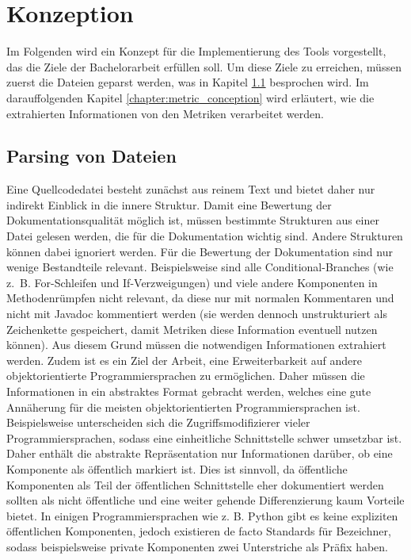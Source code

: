 \begingroup
\renewcommand{\cleardoublepage}{} %
\renewcommand{\clearpage}{}
\chapter{Konzeption}\label{chapter_conception}
\endgroup
Im Folgenden wird ein Konzept für die Implementierung des Tools vorgestellt, das die Ziele der Bachelorarbeit erfüllen soll. Um diese Ziele zu erreichen, müssen zuerst die Dateien geparst werden, was in Kapitel \ref{chapter:parsing} besprochen wird. Im darauffolgenden Kapitel \ref{chapter:metric_conception} wird erläutert, wie die extrahierten Informationen von den Metriken verarbeitet werden. 


\hfill
\section{Parsing von Dateien}\label{chapter:parsing}
Eine Quellcodedatei besteht zunächst aus reinem Text und bietet daher nur indirekt Einblick in die innere Struktur. Damit eine Bewertung der Dokumentationsqualität möglich ist, müssen bestimmte Strukturen aus einer Datei gelesen werden, die für die Dokumentation wichtig sind. Andere Strukturen können dabei ignoriert werden. Für die Bewertung der Dokumentation sind nur wenige Bestandteile relevant. Beispielsweise sind alle Conditional-Branches (wie z.~B.  For-Schleifen und If-Verzweigungen) und viele andere Komponenten in Methodenrümpfen nicht relevant, da diese nur mit normalen Kommentaren und nicht mit Javadoc kommentiert werden (sie werden dennoch unstrukturiert als Zeichenkette gespeichert, damit Metriken diese Information eventuell nutzen können). Aus diesem Grund müssen die notwendigen Informationen extrahiert werden. Zudem ist es ein Ziel der Arbeit, eine Erweiterbarkeit auf andere objektorientierte Programmiersprachen zu ermöglichen. Daher müssen die Informationen in ein abstraktes Format gebracht werden, welches eine gute Annäherung für die meisten objektorientierten Programmiersprachen ist. Beispielsweise unterscheiden sich die Zugriffsmodifizierer vieler Programmiersprachen, sodass eine einheitliche Schnittstelle schwer umsetzbar ist. Daher enthält die abstrakte Repräsentation nur Informationen darüber, ob eine Komponente als öffentlich markiert ist. Dies ist sinnvoll, da öffentliche Komponenten als Teil der öffentlichen Schnittstelle eher dokumentiert werden sollten als nicht öffentliche und eine weiter gehende Differenzierung kaum Vorteile bietet. In einigen Programmiersprachen wie z. B. Python gibt es keine expliziten öffentlichen Komponenten, jedoch existieren de facto Standards für Bezeichner, sodass beispielsweise private Komponenten zwei Unterstriche als Präfix haben.

